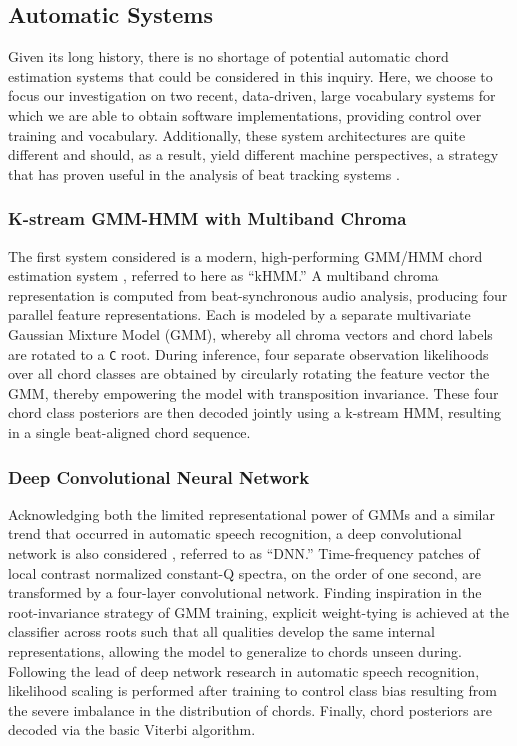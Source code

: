 \documentclass{article}
\begin{document}
\subsection{Automatic Systems}
\label{subsec:systems}

Given its long history, there is no shortage of potential automatic chord estimation systems that could be considered in this inquiry.
Here, we choose to focus our investigation on two recent, data-driven, large vocabulary systems for which we are able to obtain software implementations, providing control over training and vocabulary.
Additionally, these system architectures are quite different and should, as a result, yield different machine perspectives, a strategy that has proven useful in the analysis of beat tracking systems \cite{Zapata2012Assigning}.


\subsubsection{K-stream GMM-HMM with Multiband Chroma}
\label{subsubsec:kHMM}

The first system considered is a modern, high-performing GMM/HMM chord estimation system \cite{Cho2014Improved}, referred to here as ``kHMM.''
A multiband chroma representation is computed from beat-synchronous audio analysis, producing four parallel feature representations.
Each is modeled by a separate multivariate Gaussian Mixture Model (GMM), whereby all chroma vectors and chord labels are rotated to a \texttt{C} root.
During inference, four separate observation likelihoods over all chord classes are obtained by circularly rotating the feature vector the GMM, thereby empowering the model with transposition invariance.
These four chord class posteriors are then decoded jointly using a k-stream HMM, resulting in a single beat-aligned chord sequence.


\subsubsection{Deep Convolutional Neural Network}
\label{subsubsec:DNN}

Acknowledging both the limited representational power of GMMs and a similar trend that occurred in automatic speech recognition, a deep convolutional network is also considered \cite{Humphrey2015Fully}, referred to as ``DNN.''
Time-frequency patches of local contrast normalized constant-Q spectra, on the order of one second, are transformed by a four-layer convolutional network.
Finding inspiration in the root-invariance strategy of GMM training, explicit weight-tying is achieved at the classifier across roots such that all qualities develop the same internal representations, allowing the model to generalize to chords unseen during.
Following the lead of deep network research in automatic speech recognition, likelihood scaling is performed after training to control class bias resulting from the severe imbalance in the distribution of chords.
Finally, chord posteriors are decoded via the basic Viterbi algorithm.
\end{document}
